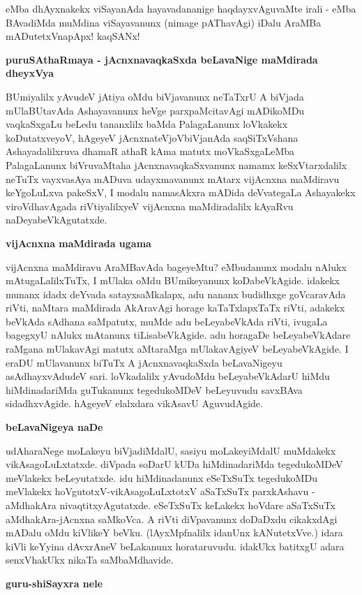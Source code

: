 eMba dhAyxnakekx viSayanAda hayavadananige haqdayxvAguvaMte irali - eMba BAvadiMda muMdina viSayavanunx (nimage pAThavAgi) iDalu AraMBa mADutetxVnapApx! kaqSANx!

\noindent
\textbf{puruSAthaRmaya - jAcnxnavaqkaSxda beLavaNige maMdirada dheyxVya}\label{page65}

BUmiyalilx yAvudeV jAtiya oMdu biVjavanunx neTaTxrU A biVjada mUlaBUtavAda Ashayavanunx heVge parxpaMcitavAgi mADikoMDu vaqkaSxgaLu beLedu tananxlilx baMda PalagaLanunx loVkakekx koDutatxveyoV, hAgeyeV jAcnxnateVjoVbiVjanAda saqSiTxVshana Ashayadalilxruva dhamaR athaR kAma matutx moVkaSxgaLeMba PalagaLanunx biVruvaMtaha jAcnxnavaqkaSxvanunx namamx keSxVtarxdalilx neTuTx vayxvasAya mADuva udayxmavanunx mAtarx vijAcnxna maMdiravu keYgoLuLxva pakeSxV, I modalu namasAkxra mADida deVvategaLa Ashayakekx viroVdhavAgada riVtiyalilxyeV vijAcnxna maMdiradalilx kAyaRvu naDeyabeVkAgutatxde.

\noindent
\textbf{vijAcnxna maMdirada ugama}

vijAcnxna maMdiravu AraMBavAda bageyeMtu? eMbudanunx modalu nAlukx mAtugaLalilxTuTx, I mUlaka oMdu BUmikeyanunx koDabeVkAgide. idakekx munanx idadx deYvada satayxsaMkalapx, adu nananx budidhxge goVcaravAda riVti, naMtara maMdirada AkAravAgi horage kaTaTxlapxTaTx riVti, adakekx beVkAda sAdhana saMpatutx, muMde adu beLeyabeVkAda riVti, ivugaLa bagegxyU nAlukx mAtanunx tiLisabeVkAgide. adu horagaDe beLeyabeVkAdare raMgana mUlakavAgi matutx aMtaraMga mUlakavAgiyeV beLeyabeVkAgide. I eraDU mUlavanunx biTuTx A jAcnxnavaqkaSxda beLavaNigeyu asAdhayxvAdudeV sari. loVkadalilx yAvudoMdu beLeyabeVkAdarU hiMdu hiMdinadariMda guTukanunx tegedukoMDeV beLeyuvudu savxBAva sidadhxvAgide. hAgeyeV elalxdara vikAsavU AguvudAgide.

\noindent
\textbf{beLavaNigeya naDe}\label{page66}

udAharaNege moLakeyu biVjadiMdalU, sasiyu moLakeyiMdalU muMdakekx vikAsagoLuLxtatxde. diVpada soDarU kUDa hiMdinadariMda tegedukoMDeV meVlakekx beLeyutatxde. idu hiMdinadanunx eSeTxSuTx tegedukoMDu meVlakekx hoVgutotxV-vikAsagoLuLxtotxV aSaTxSuTx parxkAshavu - aMdhakAra nivaqtitxyAgutatxde. eSeTxSuTx keLakekx hoVdare aSaTxSuTx aMdhakAra-jAcnxna saMkoVca. A riVti diVpavanunx doDaDxdu cikakxdAgi mADalu oMdu kiVlikeY beVku. (lAyxMpfnalilx idanUnx kANutetxVve.) idara kiVli keYyina dAvxrAneV beLakanunx horataruvudu. idakUkx batitxgU adara senxVhakUkx nikaTa saMbaMdhavide.

\noindent
\textbf{guru-shiSayxra nele}\label{page66}

